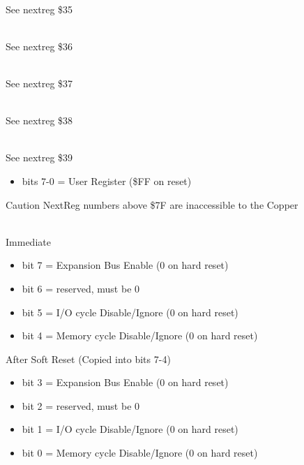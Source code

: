 \\
See nextreg \$35

\\
See nextreg \$36

\\
See nextreg \$37

\\
See nextreg \$38

\\
See nextreg \$39

\begin{itemize}
\item bits 7-0 = User Register (\$FF on reset)
\end{itemize}

Caution NextReg numbers above \$7F are inaccessible to the Copper

\\
Immediate
\begin{itemize}
\item bit 7 = Expansion Bus Enable (0 on hard reset)
\item bit 6 = reserved, must be 0
\item bit 5 = I/O cycle Disable/Ignore  (0 on
  hard reset)
\item bit 4 = Memory cycle Disable/Ignore  (0 on
  hard reset)
\end{itemize}
After Soft Reset (Copied into bits 7-4)
\begin{itemize}
\item bit 3 = Expansion Bus Enable (0 on hard reset)
\item bit 2 = reserved, must be 0
\item bit 1 = I/O cycle Disable/Ignore  (0 on
  hard reset)
\item bit 0 = Memory cycle Disable/Ignore  (0 on
  hard reset)
\end{itemize}

